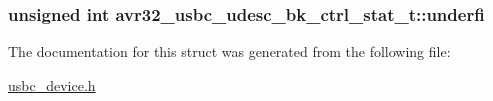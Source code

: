 \label{structavr32__usbc__udesc__bk__ctrl__stat__t_ac9ad59edfb63670572be4e0d095f15f7}
\hypertarget{structavr32__usbc__udesc__bk__ctrl__stat__t_a5a09d844a7cced23f3bc9607f414d267}{
\subsubsection[{underfi}]{\setlength{\rightskip}{0pt plus 5cm}unsigned int {\bf avr32\-\_\-usbc\-\_\-udesc\-\_\-bk\-\_\-ctrl\-\_\-stat\-\_\-t\-::underfi}}}
\label{structavr32__usbc__udesc__bk__ctrl__stat__t_a5a09d844a7cced23f3bc9607f414d267}


\-The documentation for this struct was generated from the following file\-:\begin{DoxyCompactItemize}
\item 
\hyperlink{usbc__device_8h}{usbc\-\_\-device.\-h}\end{DoxyCompactItemize}
